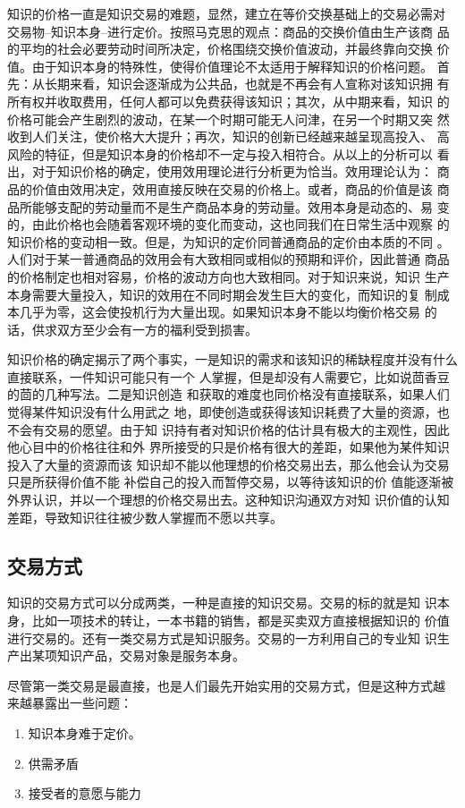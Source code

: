 \documentclass[12pt,a4paper]{ctexart}
\begin{document}
知识的价格一直是知识交易的难题，显然，建立在等价交换基础上的交易必需对
交易物--知识本身--进行定价。按照马克思的观点：商品的交换价值由生产该商
品的平均的社会必要劳动时间所决定，价格围绕交换价值波动，并最终靠向交换
价值。由于知识本身的特殊性，使得价值理论不太适用于解释知识的价格问题。
首先：从长期来看，知识会逐渐成为公共品，也就是不再会有人宣称对该知识拥
有所有权并收取费用，任何人都可以免费获得该知识；其次，从中期来看，知识
的价格可能会产生剧烈的波动，在某一个时期可能无人问津，在另一个时期又突
然收到人们关注，使价格大大提升；再次，知识的创新已经越来越呈现高投入、
高风险的特征，但是知识本身的价格却不一定与投入相符合。从以上的分析可以
看出，对于知识价格的确定，使用效用理论进行分析更为恰当。效用理论认为：
商品的价值由效用决定，效用直接反映在交易的价格上。或者，商品的价值是该
商品所能够支配的劳动量而不是生产商品本身的劳动量。效用本身是动态的、易
变的，由此价格也会随着客观环境的变化而变动，这也同我们在日常生活中观察
的知识价格的变动相一致。但是，为知识的定价同普通商品的定价由本质的不同
。人们对于某一普通商品的效用会有大致相同或相似的预期和评价，因此普通
商品的价格制定也相对容易，价格的波动方向也大致相同。对于知识来说，知识
生产本身需要大量投入，知识的效用在不同时期会发生巨大的变化，而知识的复
制成本几乎为零，这会使投机行为大量出现。如果知识本身不能以均衡价格交易
的话，供求双方至少会有一方的福利受到损害。

知识价格的确定揭示了两个事实，一是知识的需求和该知识的稀缺程度并没有什么直接联系，一件知识可能只有一个
  人掌握，但是却没有人需要它，比如说茴香豆的茴的几种写法。二是知识创造
  和获取的难度也同价格没有直接联系，如果人们觉得某件知识没有什么用武之
  地，即使创造或获得该知识耗费了大量的资源，也不会有交易的愿望。由于知
  识持有者对知识价格的估计具有极大的主观性，因此他心目中的价格往往和外
  界所接受的只是价格有很大的差距，如果他为某件知识投入了大量的资源而该
  知识却不能以他理想的价格交易出去，那么他会认为交易只是所获得价值不能
  补偿自己的投入而暂停交易，以等待该知识的价
  值能逐渐被外界认识，并以一个理想的价格交易出去。这种知识沟通双方对知
  识价值的认知差距，导致知识往往被少数人掌握而不愿以共享。

\subsection{交易方式}
知识的交易方式可以分成两类，一种是直接的知识交易。交易的标的就是知
识本身，比如一项技术的转让，一本书籍的销售，都是买卖双方直接根据知识的
价值进行交易的。还有一类交易方式是知识服务。交易的一方利用自己的专业知
识生产出某项知识产品，交易对象是服务本身。

尽管第一类交易是最直接，也是人们最先开始实用的交易方式，但是这种方式越
来越暴露出一些问题：
\begin{enumerate}
\item 知识本身难于定价。
\item 供需矛盾
\item 接受者的意愿与能力
\end{enumerate}
\end{document}
